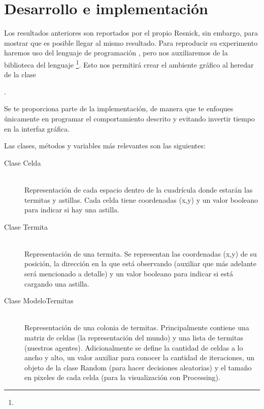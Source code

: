 \section{Desarrollo e implementaci\'on}


Los resultados anteriores son reportados por el propio Resnick, sin embargo, para mostrar que es posible llegar al mismo resultado.  Para reproducir su experimento haremos uso del lenguaje de programación \Java, pero nos auxiliaremos de la biblioteca  del lenguaje \footnote{}.  Esto nos permitirá crear el ambiente gráfico al heredar de la clase
\begin{center}
 .
\end{center}

Se te proporciona parte de la implementación, de manera que te enfoques únicamente en programar el comportamiento descrito y evitando invertir tiempo en la interfaz gráfica.

Las clases, métodos y variables más relevantes son las siguientes:

\begin{description}%
  \item[Clase Celda] \hfill \\
    Representación de cada espacio dentro de la cuadrícula donde estarán las termitas y astillas.
    Cada celda tiene coordenadas (x,y) y un valor booleano para indicar si hay una astilla.

  \item[Clase Termita] \hfill \\
    Representación de una termita. Se representan las coordenadas (x,y) de su posición, la dirección en la que está observando (auxiliar que más adelante será mencionado a detalle) y un valor booleano para indicar si está cargando una astilla.

  \item[Clase ModeloTermitas] \hfill \\
    Representación de una colonia de termitas. Principalmente contiene una matriz de celdas (la representación del mundo) y una lista de termitas (nuestros agentes). Adicionalmente se define la cantidad de celdas a lo ancho y alto, un valor auxiliar para conocer la cantidad de iteraciones, un objeto de la clase Random (para hacer decisiones aleatorias) y el tamaño en pixeles de cada celda (para la visualización con Processing).
\end{description}

